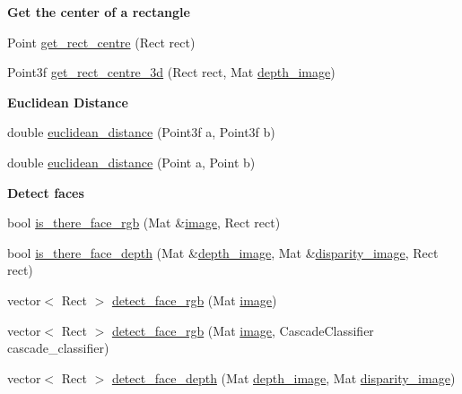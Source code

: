 \begin{Indent}{\bf Get the center of a rectangle}\par
\begin{DoxyCompactItemize}
\item 
Point \hyperlink{classCvUtils_aa54494728db8503a7311ff2f9ad8ab1c}{get\-\_\-rect\-\_\-centre} (Rect rect)
\item 
Point3f \hyperlink{classCvUtils_a9a91a1dbd7a74ef15257510129308277}{get\-\_\-rect\-\_\-centre\-\_\-3d} (Rect rect, Mat \hyperlink{social__robot__onethread_8cpp_a5b613972ff73fd7b34e0ee18acc5c1a6}{depth\-\_\-image})
\end{DoxyCompactItemize}
\end{Indent}
\begin{Indent}{\bf Euclidean Distance}\par
\begin{DoxyCompactItemize}
\item 
double \hyperlink{classCvUtils_a20d53b92663d548bebf90da242d984f3}{euclidean\-\_\-distance} (Point3f a, Point3f b)
\item 
double \hyperlink{classCvUtils_a74b4a32b47136f704db2729b39095c02}{euclidean\-\_\-distance} (Point a, Point b)
\end{DoxyCompactItemize}
\end{Indent}
\begin{Indent}{\bf Detect faces}\par
\begin{DoxyCompactItemize}
\item 
bool \hyperlink{classCvUtils_a3ffc274ba9c2db3a33e4cd0aca1b4570}{is\-\_\-there\-\_\-face\-\_\-rgb} (Mat \&\hyperlink{create__ground__truth_8cpp_aabb27b8973575043030df51be47cd24a}{image}, Rect rect)
\item 
bool \hyperlink{classCvUtils_ab1e74b543130e0ffcefb7e1a9c95354d}{is\-\_\-there\-\_\-face\-\_\-depth} (Mat \&\hyperlink{social__robot__onethread_8cpp_a5b613972ff73fd7b34e0ee18acc5c1a6}{depth\-\_\-image}, Mat \&\hyperlink{social__robot__onethread_8cpp_a485c05800d39168b94f859fac62aa6a7}{disparity\-\_\-image}, Rect rect)
\item 
vector$<$ Rect $>$ \hyperlink{classCvUtils_ac09b2e17fa71221b79c2a87732814482}{detect\-\_\-face\-\_\-rgb} (Mat \hyperlink{create__ground__truth_8cpp_aabb27b8973575043030df51be47cd24a}{image})
\item 
vector$<$ Rect $>$ \hyperlink{classCvUtils_a24520cd4e52e1c47a42a0b57c31b1a5d}{detect\-\_\-face\-\_\-rgb} (Mat \hyperlink{create__ground__truth_8cpp_aabb27b8973575043030df51be47cd24a}{image}, Cascade\-Classifier cascade\-\_\-classifier)
\item 
vector$<$ Rect $>$ \hyperlink{classCvUtils_a4a7f10293376335faeb2ba4e8abc685a}{detect\-\_\-face\-\_\-depth} (Mat \hyperlink{social__robot__onethread_8cpp_a5b613972ff73fd7b34e0ee18acc5c1a6}{depth\-\_\-image}, Mat \hyperlink{social__robot__onethread_8cpp_a485c05800d39168b94f859fac62aa6a7}{disparity\-\_\-image})
\end{DoxyCompactItemize}
\end{Indent}
